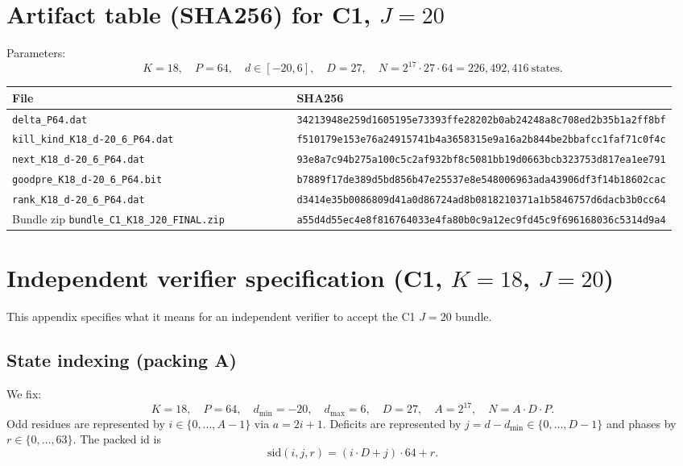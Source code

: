 \appendix

\section{Artifact table (SHA256) for C1, $J=20$}
\label{app:sha}

Parameters:
\[
K=18,\quad P=64,\quad d\in[-20,6],\quad D=27,\quad
N = 2^{17}\cdot 27\cdot 64 = 226{,}492{,}416\ \text{states}.
\]

\begin{center}
\small
\begin{tabular}{p{0.58\linewidth}p{0.38\linewidth}}
\toprule
File & SHA256 \\
\midrule
\texttt{delta\_P64.dat} &
\texttt{34213948e259d1605195e73393ffe28202b0ab24248a8c708ed2b35b1a2ff8bf} \\
\texttt{kill\_kind\_K18\_d-20\_6\_P64.dat} &
\texttt{f510179e153e76a24915741b4a3658315e9a16a2b844be2bbafcc1faf71c0f4c} \\
\texttt{next\_K18\_d-20\_6\_P64.dat} &
\texttt{93e8a7c94b275a100c5c2af932bf8c5081bb19d0663bcb323753d817ea1ee791} \\
\texttt{goodpre\_K18\_d-20\_6\_P64.bit} &
\texttt{b7889f17de389d5bd856b47e25537e8e548006963ada43906df3f14b18602cac} \\
\texttt{rank\_K18\_d-20\_6\_P64.dat} &
\texttt{d3414e35b0086809d41a0d86724ad8b0818210371a1b5846757d6dacb3b0cc64} \\
\midrule
Bundle zip \texttt{bundle\_C1\_K18\_J20\_FINAL.zip} &
\texttt{a55d4d55ec4e8f816764033e4fa80b0c9a12ec9fd45c9f696168036c5314d9a4} \\
\bottomrule
\end{tabular}
\end{center}

\section{Independent verifier specification (C1, $K=18$, $J=20$)}
\label{app:verifier-spec}

This appendix specifies what it means for an independent verifier to accept the C1 $J=20$ bundle.

\subsection*{State indexing (packing A)}
We fix:
\[
K=18,\quad P=64,\quad d_{\min}=-20,\quad d_{\max}=6,\quad D=27,\quad A=2^{17},\quad N=A\cdot D\cdot P.
\]
Odd residues are represented by $i\in\{0,\dots,A-1\}$ via $a=2i+1$.
Deficits are represented by $j=d-d_{\min}\in\{0,\dots,D-1\}$ and phases by $r\in\{0,\dots,63\}$.
The packed id is
\[
\mathrm{sid}(i,j,r)=(i\cdot D+j)\cdot 64 + r.
\]

